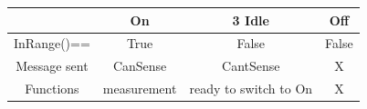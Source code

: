 \documentclass[twocolumn]{article}
\begin{document}
    \begin{center}
        \begin{adjustbox}{max width=0.45\textwidth}
        \begin{tabular}{||c c c c||}
            \hline
              & On & 3 Idle & Off \\ [0.5ex]
            \hline\hline
            InRange()==      & True      & False  & False    \\
            \hline
            Message sent      & CanSense      & CantSense     & X   \\
            \hline
            Functions      & measurement    & ready to switch to On    & X   \\
            \hline
           
            \hline
        \end{tabular}
    \end{adjustbox}
    \end{center}
    
\end{document}
